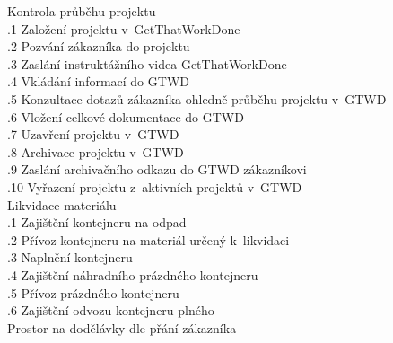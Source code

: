 \documentclass[a4paper, twoside, 11pt]{article}
\begin{document}
	 Kontrola průběhu projektu\\
		\indent {}.1 Založení projektu v~GetThatWorkDone\\
		\indent {}.2 Pozvání zákazníka do projektu\\
		\indent {}.3 Zaslání instruktážního videa GetThatWorkDone\\
		\indent {}.4 Vkládání informací do GTWD\\
		\indent {}.5 Konzultace dotazů zákazníka ohledně průběhu projektu v~GTWD\\
		\indent {}.6 Vložení celkové dokumentace do GTWD\\
		\indent {}.7 Uzavření projektu v~GTWD\\
		\indent {}.8 Archivace projektu v~GTWD\\
		\indent {}.9 Zaslání archivačního odkazu do GTWD zákazníkovi\\
		\indent {}.10 Vyřazení projektu z~aktivních projektů v~GTWD\\

	 Likvidace materiálu\\
			\indent {}.1 Zajištění kontejneru na odpad\\
			\indent {}.2 Přívoz kontejneru na materiál určený k~likvidaci\\
			\indent {}.3 Naplnění kontejneru\\
			\indent {}.4 Zajištění náhradního prázdného kontejneru\\
			\indent {}.5 Přívoz prázdného kontejneru\\
			\indent {}.6 Zajištění odvozu kontejneru plného\\

	 Prostor na dodělávky dle přání zákazníka\\
\end{document}
